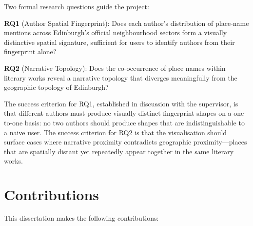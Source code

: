 \documentclass[logo,msc]{infthesis}
\begin{document}
Two formal research questions guide the project:
 
\textbf{RQ1} (Author Spatial Fingerprint): Does each author's distribution of place-name mentions across Edinburgh's official neighbourhood sectors form a visually distinctive spatial signature, sufficient for users to identify authors from their fingerprint alone?
 
\textbf{RQ2} (Narrative Topology): Does the co-occurrence of place names within literary works reveal a narrative topology that diverges meaningfully from the geographic topology of Edinburgh?
 
The success criterion for RQ1, established in discussion with the supervisor, is that different authors must produce visually distinct fingerprint shapes on a one-to-one basis: no two authors should produce shapes that are indistinguishable to a naive user. The success criterion for RQ2 is that the visualisation should surface cases where narrative proximity contradicts geographic proximity---places that are spatially distant yet repeatedly appear together in the same literary works.
 
\section{Contributions}
 
This dissertation makes the following contributions:
 
\end{document}
